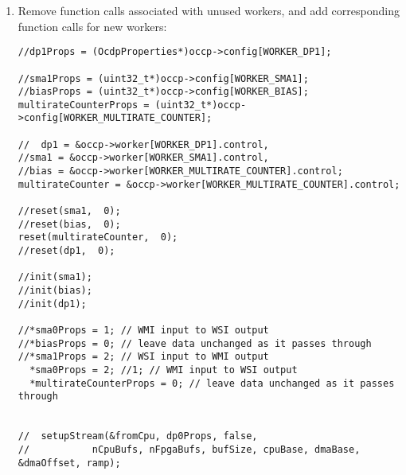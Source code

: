 \begin{enumerate}
\begin{lstlisting}[language=customc]
\end{lstlisting}
\item Remove function calls associated with unused workers, and add corresponding function calls for new workers:

\begin{lstlisting}[language=customc]
//dp1Props = (OcdpProperties*)occp->config[WORKER_DP1];                                   
                                        
//sma1Props = (uint32_t*)occp->config[WORKER_SMA1];                                         
//biasProps = (uint32_t*)occp->config[WORKER_BIAS];                                  
multirateCounterProps = (uint32_t*)occp->config[WORKER_MULTIRATE_COUNTER];                                 
                                                
//  dp1 = &occp->worker[WORKER_DP1].control,                                                                                               
//sma1 = &occp->worker[WORKER_SMA1].control,                                              
//bias = &occp->worker[WORKER_MULTIRATE_COUNTER].control;                                 
multirateCounter = &occp->worker[WORKER_MULTIRATE_COUNTER].control;
                                                                         
//reset(sma1,  0);                                                                          
//reset(bias,  0);                                                                          
reset(multirateCounter,  0);                                                                        
//reset(dp1,  0);                                                                         
                                                                                                                     
//init(sma1);                                                                             
//init(bias);                                                                           
//init(dp1);

//*sma0Props = 1; // WMI input to WSI output
//*biasProps = 0; // leave data unchanged as it passes through
//*sma1Props = 2; // WSI input to WMI output
  *sma0Props = 2; //1; // WMI input to WSI output
  *multirateCounterProps = 0; // leave data unchanged as it passes through


//  setupStream(&fromCpu, dp0Props, false,
//           nCpuBufs, nFpgaBufs, bufSize, cpuBase, dmaBase, &dmaOffset, ramp);


\end{lstlisting}
\end{enumerate}
